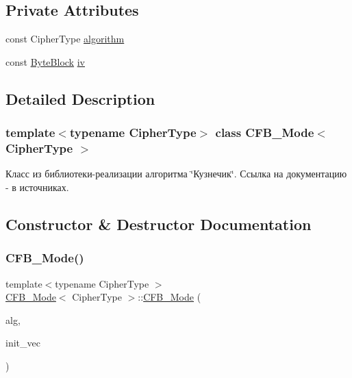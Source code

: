 \subsection*{Private Attributes}
\begin{DoxyCompactItemize}
\item 
const Cipher\+Type \hyperlink{class_c_f_b___mode_a98305e12bef9c0e5e07b7d2914dc8f52}{algorithm}
\item 
const \hyperlink{class_byte_block}{Byte\+Block} \hyperlink{class_c_f_b___mode_a894c65328ecaf2095dd283bc263620fe}{iv}
\end{DoxyCompactItemize}


\subsection{Detailed Description}
\subsubsection*{template$<$typename Cipher\+Type$>$\newline
class C\+F\+B\+\_\+\+Mode$<$ Cipher\+Type $>$}

Класс из библиотеки-\/реализации алгоритма \char`\"{}Кузнечик\char`\"{}. Ссылка на документацию -\/ в источниках. 

\subsection{Constructor \& Destructor Documentation}
\mbox{\label{class_c_f_b___mode_a191bd9146ea20372148bbd10f25cb5d5}} 
\subsubsection{\texorpdfstring{C\+F\+B\+\_\+\+Mode()}{CFB\_Mode()}}
{\footnotesize\ttfamily template$<$typename Cipher\+Type $>$ \\
\hyperlink{class_c_f_b___mode}{C\+F\+B\+\_\+\+Mode}$<$ Cipher\+Type $>$\+::\hyperlink{class_c_f_b___mode}{C\+F\+B\+\_\+\+Mode} (\begin{DoxyParamCaption}\item[{const Cipher\+Type \&}]{alg,  }\item[{const \hyperlink{class_byte_block}{Byte\+Block} \&}]{init\+\_\+vec }\end{DoxyParamCaption})}



